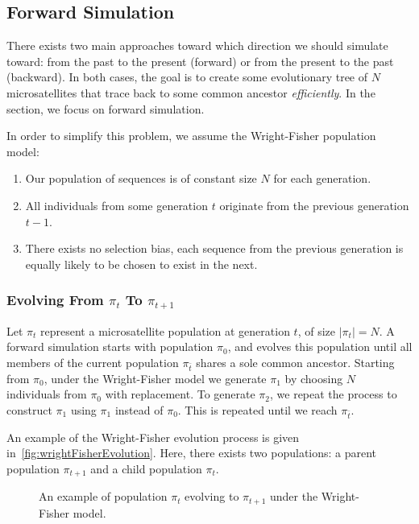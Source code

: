 \subsection{Forward Simulation}\label{subsec:fs}
There exists two main approaches toward which direction we should simulate toward: from the past to the present
(forward) or from the present to the past (backward).
In both cases, the goal is to create some evolutionary tree of $N$ microsatellites that trace back to some common
ancestor \emph{efficiently}.
In the section, we focus on forward simulation.

In order to simplify this problem, we assume the Wright-Fisher population model:
\begin{enumerate}
    \item Our population of sequences is of constant size $N$ for each generation.
    \item All individuals from some generation $t$ originate from the previous generation $t - 1$.
    \item There exists no selection bias, each sequence from the previous generation is equally likely to be
        chosen to exist in the next.
\end{enumerate}

\subsubsection{Evolving From $\pi_t$ To $\pi_{t+1}$}
Let $\pi_t$ represent a microsatellite population at generation $t$, of size $\left|\pi_t \right| = N$.
A forward simulation starts with population $\pi_0$, and evolves this population until all members of the current
population $\pi_{\bar{t}}$ shares a sole common ancestor.
Starting from $\pi_0$, under the Wright-Fisher model we generate $\pi_1$ by choosing $N$ individuals from $\pi_0$ with
replacement.
To generate $\pi_2$, we repeat the process to construct $\pi_1$ using $\pi_1$ instead of $\pi_0$.
This is repeated until we reach $\pi_{\bar{t}}$.

An example of the Wright-Fisher evolution process is given in~\autoref{fig:wrightFisherEvolution}.
Here, there exists two populations: a parent population $\pi_{t+1}$ and a child population $\pi_t$.


\begin{figure}
    \centering{}
    \caption{An example of population $\pi_{t}$ evolving to $\pi_{t+1}$ under the Wright-Fisher model.}
    \label{fig:wrightFisherEvolution}
\end{figure}


